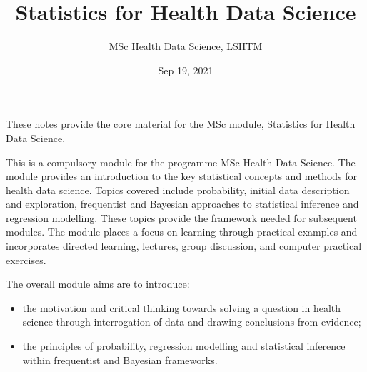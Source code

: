 \documentclass[letterpaper,10pt,english]{jupyterBook}
\title{Statistics for Health Data Science}
\date{Sep 19, 2021}
\author{MSc Health Data Science, LSHTM}
\begin{document}
\pagestyle{empty}
\sphinxmaketitle
\pagestyle{plain}
\sphinxtableofcontents
\pagestyle{normal}
\label{\detokenize{00. Welcome::doc}}


\sphinxAtStartPar
These notes provide the core material for the MSc module, Statistics for Health Data Science.

\sphinxAtStartPar
This is a compulsory module for the programme MSc Health Data Science. The module provides an introduction to the key statistical concepts and methods for health data science. Topics covered include probability, initial data description and
exploration, frequentist and Bayesian approaches to statistical inference and  regression modelling. These topics provide the framework needed for subsequent modules. The module places a focus on learning through practical examples and incorporates directed learning, lectures, group discussion, and computer practical exercises.

\begin{DUlineblock}{0em}
\item[] 
\end{DUlineblock}

\sphinxAtStartPar
The overall module aims are to introduce:
\begin{itemize}
\item {} 
\sphinxAtStartPar
the motivation and critical thinking towards solving a question in health science through interrogation of data and drawing conclusions from evidence;

\item {} 
\sphinxAtStartPar
the principles of probability, regression modelling and statistical inference within frequentist and Bayesian frameworks.

\end{itemize}

\begin{DUlineblock}{0em}
\item[] 
\end{DUlineblock}
\end{document}
